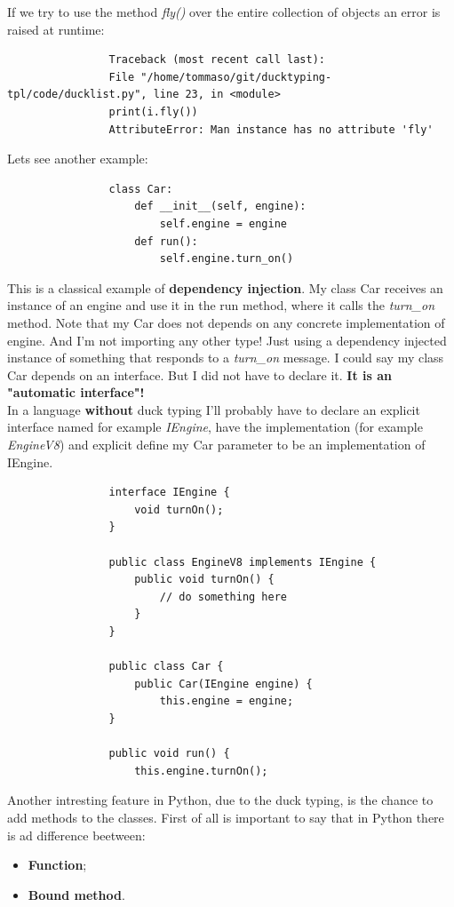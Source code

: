 \documentclass[12pt]{article}
\begin{document}
			If we try to use the method \textit{fly()} over the entire collection of objects an error is raised at runtime:
			
			\begin{lstlisting}
				Traceback (most recent call last):
				File "/home/tommaso/git/ducktyping-tpl/code/ducklist.py", line 23, in <module>
				print(i.fly())
				AttributeError: Man instance has no attribute 'fly'
			\end{lstlisting}
			
			Lets see another example:
			
			\begin{lstlisting}
				class Car:
					def __init__(self, engine):
						self.engine = engine
					def run():
						self.engine.turn_on()			
			\end{lstlisting}
			
			This is a classical example of \textbf{dependency injection}. My class Car receives an instance of an engine and use it in the run method, where it calls the \textit{turn\_on} method. Note that my Car does not depends on any concrete implementation of engine. And I'm not importing any other type! Just using a dependency injected instance of something that responds to a \textit{turn\_on} message. I could say my class Car depends on an interface. But I did not have to declare it. \textbf{It is an "automatic interface"!}\\
			In a language \textbf{without} duck typing I'll probably have to declare an explicit interface named for example \textit{IEngine}, have the implementation (for example \textit{EngineV8}) and explicit define my Car parameter to be an implementation of IEngine.
			
			\begin{lstlisting}
				interface IEngine {
					void turnOn();
				}
				
				public class EngineV8 implements IEngine {
					public void turnOn() {
						// do something here
					}
				}
				
				public class Car {
					public Car(IEngine engine) {
						this.engine = engine;
				}
				
				public void run() {
					this.engine.turnOn();
			\end{lstlisting}
			
		Another intresting feature in Python, due to the duck typing, is the chance to add methods to the classes. First of all is important to say that in Python there is ad difference beetween:
		\begin{itemize}
			\item \textbf{Function};
			\item \textbf{Bound method}.
		\end{itemize} 
	
\end{document}
